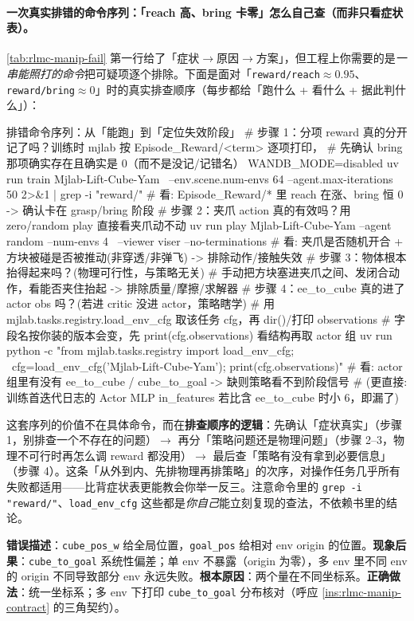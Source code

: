 \paragraph{一次真实排错的命令序列：「reach 高、bring 卡零」怎么自己查（而非只看症状表）。}\cref{tab:rlmc-manip-fail} 第一行给了「症状$\to$原因$\to$方案」，但工程上你需要的是\emph{一串能照打的命令}把可疑项逐个排除。下面是面对「\verb|reward/reach|$\approx0.95$、\verb|reward/bring|$\approx0$」时的真实排查顺序（每步都给「跑什么 + 看什么 + 据此判什么」）：
\begin{codebox}[bash]{排错命令序列：从「能跑」到「定位失效阶段」}
# 步骤 1：分项 reward 真的分开记了吗？训练时 mjlab 按 Episode_Reward/<term> 逐项打印，
#         先确认 bring 那项确实存在且确实是 0（而不是没记/记错名）
WANDB_MODE=disabled uv run train Mjlab-Lift-Cube-Yam \
    --env.scene.num-envs 64 --agent.max-iterations 50 2>&1 | grep -i "reward/"
#   看: Episode_Reward/* 里 reach 在涨、bring 恒 0 -> 确认卡在 grasp/bring 阶段
# 步骤 2：夹爪 action 真的有效吗？用 zero/random play 直接看夹爪动不动
uv run play Mjlab-Lift-Cube-Yam --agent random --num-envs 4 \
    --viewer viser --no-terminations
#   看: 夹爪是否随机开合 + 方块被碰是否被推动(非穿透/非弹飞) -> 排除动作/接触失效
# 步骤 3：物体根本抬得起来吗？(物理可行性，与策略无关)
#   手动把方块塞进夹爪之间、发闭合动作，看能否夹住抬起 -> 排除质量/摩擦/求解器
# 步骤 4：ee_to_cube 真的进了 actor obs 吗？(若进 critic 没进 actor，策略瞎学)
#   用 mjlab.tasks.registry.load_env_cfg 取该任务 cfg，再 dir()/打印 observations
#   字段名按你装的版本会变，先 print(cfg.observations) 看结构再取 actor 组
uv run python -c "from mjlab.tasks.registry import load_env_cfg; \
  cfg=load_env_cfg('Mjlab-Lift-Cube-Yam'); print(cfg.observations)"
#   看: actor 组里有没有 ee_to_cube / cube_to_goal -> 缺则策略看不到阶段信号
#   (更直接: 训练首迭代日志的 Actor MLP in_features 若比含 ee_to_cube 时小 6，即漏了)
\end{codebox}
这套序列的价值不在具体命令，而在\textbf{排查顺序的逻辑}：先确认「症状真实」（步骤 1，别排查一个不存在的问题）$\to$ 再分「策略问题还是物理问题」（步骤 2--3，物理不可行时再怎么调 reward 都没用）$\to$ 最后查「策略有没有拿到必要信息」（步骤 4）。这条「从外到内、先排物理再排策略」的次序，对操作任务几乎所有失败都适用——比背症状表更能教会你举一反三。注意命令里的 \verb|grep -i "reward/"|、\verb|load_env_cfg| 这些都是\emph{你自己}能立刻复现的查法，不依赖书里的结论。

\begin{pitfall}[object pose 的坐标系不一致]
\textbf{错误描述}：\verb|cube_pos_w| 给全局位置，\verb|goal_pos| 给相对 env origin 的位置。\textbf{现象后果}：\verb|cube_to_goal| 系统性偏差；单 env 不暴露（origin 为零），多 env 里不同 env 的 origin 不同导致部分 env 永远失败。\textbf{根本原因}：两个量在不同坐标系。\textbf{正确做法}：统一坐标系；多 env 下打印 \verb|cube_to_goal| 分布核对（呼应 \cref{ins:rlmc-manip-contract} 的三角契约）。
\end{pitfall}

